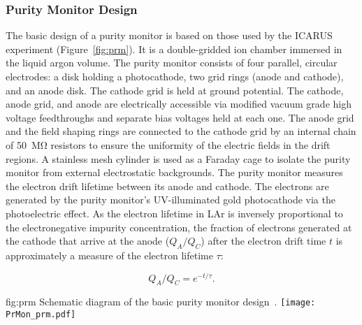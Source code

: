 \subsubsection{Purity Monitor Design}

The basic design of a purity monitor is based on those used by the ICARUS experiment (Figure~\ref{fig:prm})\cite{Adamowski:2014daa}. It is a double-gridded ion chamber immersed in the liquid argon volume.   The purity monitor consists of four parallel, circular electrodes: a disk holding a photocathode, two grid rings (anode and cathode), and an anode disk. The cathode grid is held at ground potential. The cathode, anode grid, and anode are electrically accessible via modified vacuum grade high voltage feedthroughs and separate bias voltages held at each one.  The anode grid and the field shaping rings are connected to the cathode grid by an internal chain of \SI{50}{\mega\ohm} resistors to ensure the uniformity of the electric fields in the drift regions. A stainless mesh cylinder is used as a Faraday cage to isolate the purity monitor from external electrostatic backgrounds. The purity monitor measures the electron drift lifetime between its anode and cathode. The electrons are generated by the purity monitor's UV-illuminated gold photocathode via the photoelectric effect. As the electron lifetime in LAr is inversely proportional to the electronegative impurity concentration, the fraction of electrons generated at the cathode that arrive at the anode ($Q_A/Q_C$) after the electron drift time $t$ is approximately a measure of the electron lifetime $\tau$: 

$$ Q_A/Q_C=e^{-t/\tau}. $$

\begin{dunefigure}{fig:prm}
  {Schematic diagram of the basic purity monitor design~\cite{Adamowski:2014daa}.}
  \texttt{[image: PrMon\_prm.pdf]}
\end{dunefigure}


